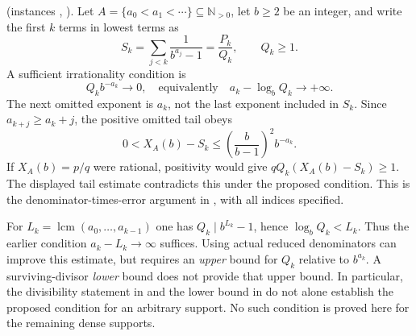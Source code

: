 \begin{obs}
 (instances
,
).
Let $A=\{a_0<a_1<\cdots\}\subseteq\mathbb N_{>0}$, let $b\ge2$ be an integer, and
write the first $k$ terms in lowest terms as
\[
 S_k=\sum_{j<k}\frac1{b^{a_j}-1}=\frac{P_k}{Q_k},\qquad Q_k\ge1.
\]
A sufficient irrationality condition is
\[
 Q_k b^{-a_k}\longrightarrow0,
 \quad\text{equivalently}\quad a_k-\log_b Q_k\longrightarrow+\infty.
\]
The next omitted exponent is $a_k$, not the last exponent included
in $S_k$.  Since $a_{k+j}\ge a_k+j$, the positive omitted tail obeys
\[
 0<X_A(b)-S_k
 \le\left(\frac{b}{b-1}\right)^2b^{-a_k}.
\]
If $X_A(b)=p/q$ were rational, positivity would give
$qQ_k(X_A(b)-S_k)\ge1$.  The displayed tail estimate contradicts
this under the proposed condition.  This is the denominator-times-error
argument in ,
with all indices specified.

For $L_k=\operatorname{lcm}(a_0,\ldots,a_{k-1})$ one has
$Q_k\mid b^{L_k}-1$, hence $\log_b Q_k<L_k$.
Thus the earlier condition $a_k-L_k\to\infty$ suffices.
Using actual reduced denominators can improve this estimate, but
requires an \emph{upper} bound for $Q_k$ relative to $b^{a_k}$.
A surviving-divisor \emph{lower} bound does not provide that upper
bound.  In particular, the divisibility statement in
 and the lower bound in
do not alone establish the proposed condition for an arbitrary
support.  No such condition is proved here for the remaining dense
supports.
\end{obs}

